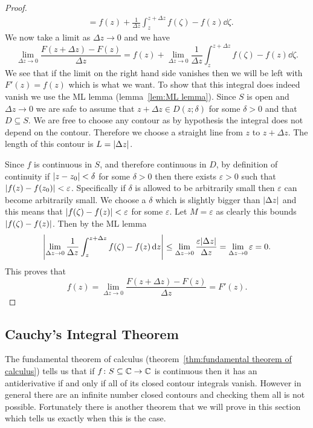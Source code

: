 \documentclass{article}
\newcommand{\discOpen}[2]{D\left({#1}; {#2}\right)}
\begin{document}
\begin{proof}
\begin{align*}
            &= f(z) + \frac{1}{\Delta z} \int_{z}^{z + \Delta z} f(\zeta) - f(z)\dd{\zeta}.
        \end{align*}
        We now take a limit as \(\Delta z \to 0\) and we have
        \[\lim_{\Delta z \to 0} \frac{F(z + \Delta z) - F(z)}{\Delta z} = f(z) + \lim_{\Delta z\to 0} \frac{1}{\Delta z}\int_{z}^{z + \Delta z} f(\zeta) - f(z)\dd{\zeta}.\]
        We see that if the limit on the right hand side vanishes then we will be left with \(F'(z) = f(z)\) which is what we want.
        To show that this integral does indeed vanish we use the ML lemma (lemma~\ref{lem:ML lemma}).
        Since \(S\) is open and \(\Delta z \to 0\) we are safe to assume that \(z + \Delta z\in \discOpen{z}{\delta}\) for some \(\delta > 0\) and that \(D\subseteq S\).
        We are free to choose any contour as by hypothesis the integral does not depend on the contour.
        Therefore we choose a straight line from \(z\) to \(z + \Delta z\).
        The length of this contour is \(L = \abs{\Delta z}\).
        
        Since \(f\) is continuous in \(S\), and therefore continuous in \(D\), by definition of continuity if \(\abs{z - z_0} < \delta\) for some \(\delta > 0\) then there exists \(\varepsilon>0\) such that \(\abs{f(z) - f(z_0)} < \varepsilon\).
        Specifically if \(\delta\) is allowed to be arbitrarily small then \(\varepsilon\) can become arbitrarily small.
        We choose a \(\delta\) which is slightly bigger than \(\abs{\Delta z}\) and this means that \(\abs{f(\zeta) - f(z)} < \varepsilon\) for some \(\varepsilon\).
        Let \(M = \varepsilon\) as clearly this bounds \(\abs{f(\zeta) - f(z)}\).
        Then by the ML lemma
        \[\abs{\lim_{\Delta z\to 0} \frac{1}{\Delta z} \int_z^{z + \Delta z} f(\zeta) - f(z)\dd{z}} \le \lim_{\Delta z\to 0}\frac{\varepsilon\abs{\Delta z}}{\Delta z} = \lim_{\Delta z\to 0}\varepsilon = 0.\]
        This proves that
        \[f(z) = \lim_{\Delta z\to 0} \frac{F(z + \Delta z) - F(z)}{\Delta z} = F'(z).\]
    \end{proof}
    
    \subsection{Cauchy's Integral Theorem}
    The fundamental theorem of calculus (theorem~\ref{thm:fundamental theorem of calculus}) tells us that if \(f\colon S\subseteq\mathbb{C}\to\mathbb{C}\) is continuous then it has an antiderivative if and only if all of its closed contour integrals vanish.
    However in general there are an infinite number closed contours and checking them all is not possible.
    Fortunately there is another theorem that we will prove in this section which tells us exactly when this is the case.
    
\end{document}

